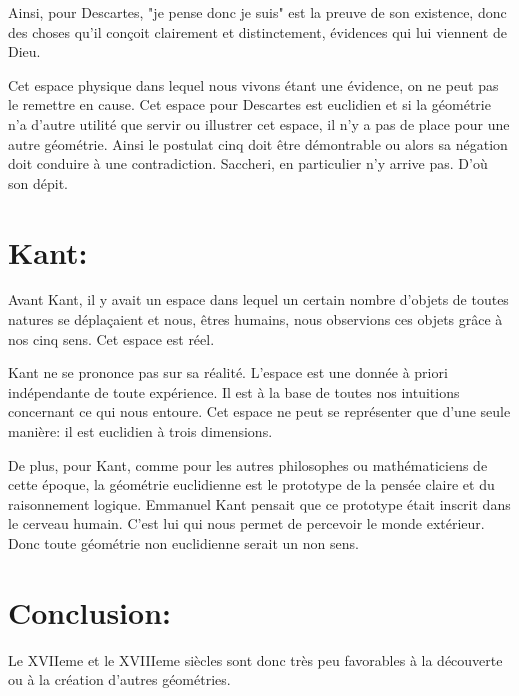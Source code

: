\documentclass[a4paper, 12pt, twoside]{book}
\begin{document}
Ainsi, pour Descartes, "je pense donc je suis" est  la preuve de son existence, donc des choses qu'il conçoit clairement et distinctement, évidences qui lui viennent de Dieu.\

 Cet espace physique dans lequel nous vivons étant une évidence, on ne peut pas le remettre en cause. Cet espace pour Descartes est euclidien et si la géométrie n'a d'autre utilité que servir ou illustrer cet espace, il n'y a pas de place pour une autre géométrie. Ainsi le postulat cinq doit être démontrable ou alors sa négation doit conduire à une contradiction. Saccheri, en particulier n'y arrive pas. D'où son dépit.

   
   \section{Kant:}
   
    Avant Kant, il y avait un espace dans lequel un certain
nombre d’objets de toutes natures se déplaçaient et nous, êtres humains, nous
observions ces objets grâce à nos cinq sens. Cet espace est réel. 

 Kant ne se prononce pas sur sa réalité. L’espace est une donnée à priori indépendante de toute expérience. Il est à la base de toutes nos intuitions concernant ce qui nous entoure. Cet espace ne peut se représenter que d'une seule manière: il est euclidien à trois dimensions.\
   
    De plus, pour Kant, comme pour les  autres philosophes ou mathématiciens de cette époque, la géométrie euclidienne est le prototype de la pensée claire et du raisonnement logique. Emmanuel Kant pensait que ce prototype  était inscrit dans le cerveau humain. C'est lui qui nous permet de percevoir le monde extérieur.\\
    
   
  
  
   
  Donc toute géométrie non euclidienne serait un non sens.\\






 


\section{Conclusion:}

Le XVIIeme et le XVIIIeme siècles sont donc très peu favorables à la découverte ou à la création d'autres géométries.\
\end{document}
